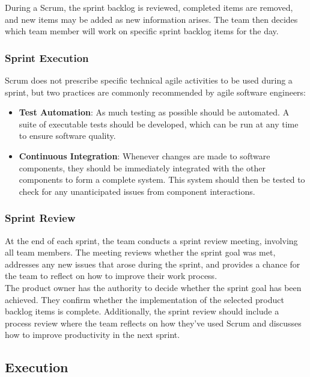 During a Scrum, the sprint backlog is reviewed, completed items are removed, and new items may be added as new information arises. The team then decides which team member will work on specific sprint backlog items for the day.

\subsubsection{Sprint Execution}

Scrum does not prescribe specific technical agile activities to be used during a sprint, but two practices are commonly recommended by agile software engineers:

\begin{itemize}
    \item \textbf{Test Automation}: As much testing as possible should be automated. A suite of executable tests should be developed, which can be run at any time to ensure software quality.
    \item \textbf{Continuous Integration}: Whenever changes are made to software components, they should be immediately integrated with the other components to form a complete system. This system should then be tested to check for any unanticipated issues from component interactions.
\end{itemize}

\subsubsection{Sprint Review}

At the end of each sprint, the team conducts a sprint review meeting, involving all team members. The meeting reviews whether the sprint goal was met, addresses any new issues that arose during the sprint, and provides a chance for the team to reflect on how to improve their work process. \\

The product owner has the authority to decide whether the sprint goal has been achieved. They confirm whether the implementation of the selected product backlog items is complete. Additionally, the sprint review should include a process review where the team reflects on how they’ve used Scrum and discusses how to improve productivity in the next sprint.

\subsection{Execution}

